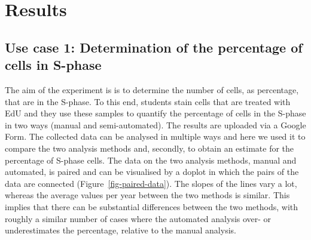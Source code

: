 \documentclass[
]{agujournal2019}
\begin{document}
\hypertarget{sec-results}{%
\section*{Results}\label{sec-results}}

\hypertarget{use-case-1-determination-of-the-percentage-of-cells-in-s-phase}{%
\subsection*{Use case 1: Determination of the percentage of cells in
S-phase}\label{use-case-1-determination-of-the-percentage-of-cells-in-s-phase}}

The aim of the experiment is is to determine the number of cells, as
percentage, that are in the S-phase. To this end, students stain cells
that are treated with EdU and they use these samples to quantify the
percentage of cells in the S-phase in two ways (manual and
semi-automated). The results are uploaded via a Google Form. The
collected data can be analysed in multiple ways and here we used it to
compare the two analysis methods and, secondly, to obtain an estimate
for the percentage of S-phase cells. The data on the two analysis
methods, manual and automated, is paired and can be visualised by a
doplot in which the pairs of the data are connected
(Figure~\ref{fig-paired-data}). The slopes of the lines vary a lot,
whereas the average values per year between the two methods is similar.
This implies that there can be substantial differences between the two
methods, with roughly a similar number of cases where the automated
analysis over- or underestimates the percentage, relative to the manual
analysis.
\end{document}
